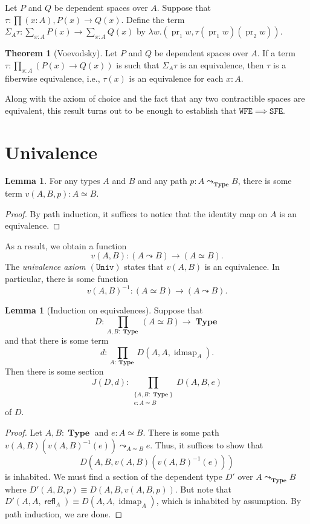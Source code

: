 \documentclass[10pt,letterpaper,cm]{nupset}
\theoremstyle{definition}
\theoremstyle{theorem}
\newtheorem{theorem}[definition]{Theorem}
\newtheorem{lemma}[definition]{Lemma}
\theoremstyle{remark}
\newcommand{\1}{\mathbf{1}}
\newcommand{\wfe}{\mathtt{WFE}}
\newcommand{\sfe}{\mathtt{SFE}}
\newcommand{\univ}{\mathtt{Univ}}
\newcommand{\0}{\vec 0}
\DeclareMathOperator{\idmap}{idmap}
\DeclareMathOperator{\refl}{\mathsf{refl}}
\DeclareMathOperator{\pr}{pr}
\DeclareMathOperator{\type}{\mathbf{Type}}
\begin{document}
\smallskip

Let $P$ and $Q$ be dependent spaces over $A$. Suppose that $\tau : \prod(x:A), P(x) \to Q(x)$. Define the term $\Sigma_A\tau : \sum_{x:A}P(x) \to \sum_{x:A} Q(x)$ by $\lambda w. (\pr_1 w, \tau(\pr_1w)(\pr_2w))$.


\begin{theorem}[Voevodsky]
Let $P$ and $Q$ be dependent spaces over $A$. If a term $\tau : \prod_{x:A}\left(P(x) \to Q(x)\right)$ is such that $\Sigma_A \tau$ is an equivalence, then $\tau$ is a fiberwise equivalence, i.e., $\tau(x)$ is an equivalence for each $x:A$. 
\end{theorem}

Along with the axiom of choice and the fact that any two contractible spaces are equivalent, this result turns out to be enough to establish that $\wfe \implies \sfe$.


\section{Univalence}

\begin{lemma}
For any types $A$ and $B$ and any path $p: A \leadsto_{\type} B$, there is some term $v(A, B, p) : A \simeq B$.  
\end{lemma}
\begin{proof}
By path induction, it suffices to notice that the identity map on $A$ is an equivalence.
\end{proof}

As a result, we obtain a function $$v(A, B) : \left(A \leadsto B\right) \to \left(A \simeq B\right).$$
The \textit{univalence axiom $(\univ)$} states that $v(A, B)$ is an equivalence. 
In particular, there is some function $$v(A, B) ^{{-}1}: \left(A \simeq B\right) \to \left(A \leadsto B\right).$$

\smallskip

\begin{lemma}[Induction on equivalences] 
Suppose that $$D: \prod_{A, B : \type}\left(A \simeq B\right) \to \type$$ and that there is some term $$d: \prod_{A: \type}D(A, A, \idmap_A).$$ Then there is some section  $$J(D, d)  :  \prod_{\substack{\{A,B:\type\} \\ e:A\simeq B}} D(A,B,e) $$ of $D$. 
\end{lemma}
\begin{proof}
Let $A,B: \type$ and $e: A \simeq B$. There is some path $v(A,B)(v(A,B)^{{-}1}(e))\leadsto_{A\simeq B} e$. Thus, it suffices to show that $$D(A, B, v(A,B)(v(A,B)^{{-}1}(e)))$$ is inhabited. We must  find a section of the dependent type $D'$ over $A\leadsto_{\type} B$ where $D'(A, B, p) \equiv D(A, B, v(A, B, p))$. But note that $D'(A, A, \refl_A) \equiv D(A, A, \idmap_A)$, which is inhabited by assumption. By path induction, we are done.
\end{proof}
\end{document}
